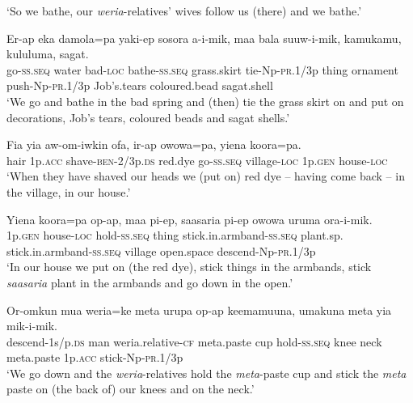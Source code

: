 \glt ‘So we bathe, our \textit{weria}{}-relatives’ wives follow us (there) and we bathe.’ \\
\z


\ea\label{ex:a:x10}
\gll  Er-ap  eka  damola=pa  yaki-ep  sosora  a-i-mik,                maa  bala  suuw-i-mik,  kamukamu,  kululuma,  sagat. \\
go-\textsc{ss.seq}  water  bad-\textsc{loc}  bathe-\textsc{ss.seq}  grass.skirt  tie-Np-\textsc{pr}.1/3p  thing  ornament  push-Np-\textsc{pr}.1/3p  Job’s.tears  coloured.bead  sagat.shell \\


\glt ‘We go and bathe in the bad spring and (then) tie the grass skirt on and put on decorations, Job’s tears, coloured beads and sagat shells.’ \\
\z


\ea\label{ex:a:x11}
\gll  Fia  yia  aw-om-iwkin  ofa,  ir-ap  owowa=pa,              yiena  koora=pa. \\
hair  1p.\textsc{acc}  shave-\textsc{ben}-2/3p.\textsc{ds}  red.dye  go-\textsc{ss.seq}  village-\textsc{loc} 1p.\textsc{gen}  house-\textsc{loc} \\


\glt ‘When they have shaved our heads we (put on) red dye – having come back – in the village, in our house.’ \\
\z


\ea\label{ex:a:x12}
\gll  Yiena  koora=pa  op-ap,  maa  pi-ep,                      saasaria  pi-ep  owowa  uruma  ora-i-mik. \\
1p.\textsc{gen}  house-\textsc{loc}  hold-\textsc{ss.seq}  thing  stick.in.armband-\textsc{ss.seq}  plant.sp.  stick.in.armband-\textsc{ss.seq}  village  open.space  descend-Np-\textsc{pr}.1/3p \\


\glt ‘In our house we put on (the red dye), stick things in the armbands, stick \textit{saasaria} plant in the armbands and go down in the open.’ \\
\z


\ea\label{ex:a:x13}
\gll  Or-omkun  mua  weria=ke  meta  urupa  op-ap                      keemamuuna,  umakuna  meta  yia  mik-i-mik. \\
descend-1s/p.\textsc{ds}  man  weria.relative-\textsc{cf}  meta.paste  cup  hold-\textsc{ss.seq}  knee  neck  meta.paste  1p.\textsc{acc}  stick-Np-\textsc{pr}.1/3p \\


\glt ‘We go down and the \textit{weria}{}-relatives hold the \textit{meta}{}-paste cup and stick the \textit{meta} paste on (the back of) our knees and on the neck.’ \\
\z


